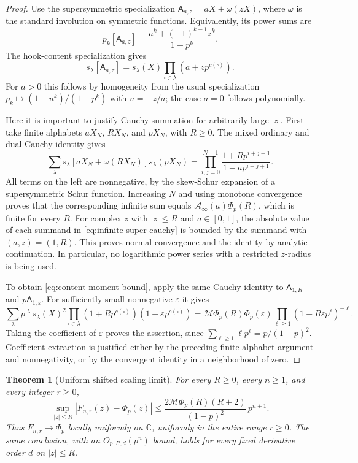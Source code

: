 \documentclass[11pt]{article}
\numberwithin{equation}{section}
\newtheorem{theorem}{Theorem}[section]
\theoremstyle{definition}
\theoremstyle{remark}
\newcommand{\C}{\mathbb{C}}
\begin{document}
\begin{proof}
Use the supersymmetric specialization
$\mathsf A_{a,z}=aX+\omega(zX)$, where $\omega$ is the standard
involution on symmetric functions. Equivalently, its power sums are
\[
 p_k[\mathsf A_{a,z}]
 =\frac{a^k+(-1)^{k-1}z^k}{1-p^k}.
\]
The hook-content specialization gives
\begin{equation}\label{eq:super-hook-content}
 s_\lambda[\mathsf A_{a,z}]
 =s_\lambda(X)\prod_{\square\in\lambda}(a+zp^{c(\square)}).
\end{equation}
For $a>0$ this follows by homogeneity from the usual specialization
$p_k\mapsto(1-u^k)/(1-p^k)$ with $u=-z/a$; the case $a=0$ follows
polynomially.

Here it is important to justify Cauchy summation for arbitrarily large
$|z|$. First take finite alphabets $aX_N$, $RX_N$, and $pX_N$, with
$R\ge0$. The mixed ordinary and dual Cauchy identity gives
\[
 \sum_\lambda s_\lambda[aX_N+\omega(RX_N)]s_\lambda(pX_N)
 =\prod_{i,j=0}^{N-1}\frac{1+Rp^{i+j+1}}{1-ap^{i+j+1}}.
\]
All terms on the left are nonnegative, by the skew-Schur expansion
of a supersymmetric Schur function. Increasing $N$ and using monotone
convergence proves that the corresponding infinite sum equals
$\mathcal A_\infty(a)\Phi_p(R)$, which is finite for every $R$.
For complex $z$ with $|z|\le R$ and $a\in[0,1]$, the absolute value of
each summand in \eqref{eq:infinite-super-cauchy} is bounded by the
summand with $(a,z)=(1,R)$. This proves normal convergence and the
identity by analytic continuation. In particular, no logarithmic power
series with a restricted $z$-radius is being used.

To obtain \eqref{eq:content-moment-bound}, apply the same Cauchy identity
to $\mathsf A_{1,R}$ and $p\mathsf A_{1,\varepsilon}$. For sufficiently
small nonnegative $\varepsilon$ it gives
\[
 \sum_\lambda p^{|\lambda|}s_\lambda(X)^2
 \prod_{\square\in\lambda}(1+Rp^{c(\square)})
                            (1+\varepsilon p^{c(\square)})
 =\mathcal M\Phi_p(R)\Phi_p(\varepsilon)
   \prod_{\ell\ge1}(1-R\varepsilon p^\ell)^{-\ell}.
\]
Taking the coefficient of $\varepsilon$ proves the assertion, since
$\sum_{\ell\ge1}\ell p^\ell=p/(1-p)^2$. Coefficient extraction is
justified either by the preceding finite-alphabet argument and
nonnegativity, or by the convergent identity in a neighborhood of zero.
\end{proof}

\begin{theorem}[Uniform shifted scaling limit]\label{thm:scaled-limit}
For every $R\ge0$, every $n\ge1$, and every integer $r\ge0$,
\begin{equation}\label{eq:scaled-limit-explicit}
 \sup_{|z|\le R}|F_{n,r}(z)-\Phi_p(z)|
 \le
 \frac{2\mathcal M\Phi_p(R)(R+2)}{(1-p)^2}\,p^{n+1}.
\end{equation}
Thus $F_{n,r}\to\Phi_p$ locally uniformly on $\C$, uniformly in the
entire range $r\ge0$. The same conclusion, with an $O_{p,R,d}(p^n)$
bound, holds for every fixed derivative order $d$ on $|z|\le R$.
\end{theorem}
\end{document}
